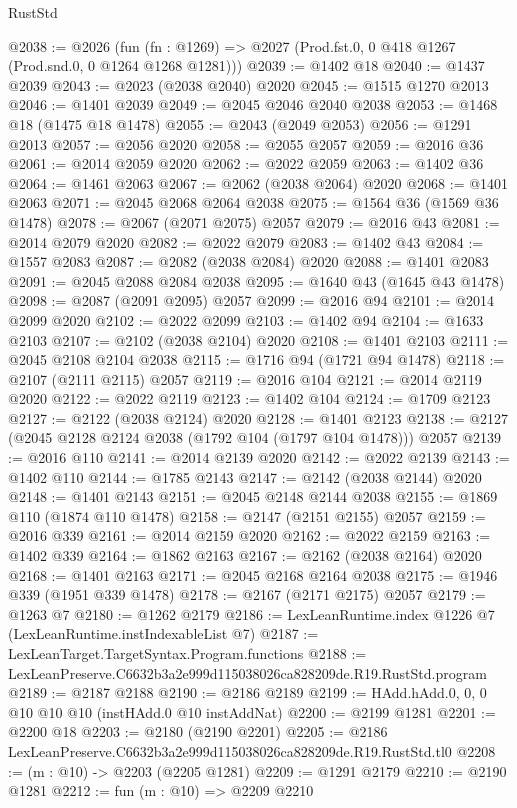 \begin{lexlean}{RustStd}
\begin{coremodule}
@2038 := @2026
    (fun (fn : @1269) => @2027 (Prod.fst.{0, 0} @418 @1267 (Prod.snd.{0, 0} @1264 @1268 @1281)))
@2039 := @1402 @18
@2040 := @1437 @2039
@2043 := @2023 (@2038 @2040) @2020
@2045 := @1515 @1270 @2013
@2046 := @1401 @2039
@2049 := @2045 @2046 @2040 @2038
@2053 := @1468 @18 (@1475 @18 @1478)
@2055 := @2043 (@2049 @2053)
@2056 := @1291 @2013
@2057 := @2056 @2020
@2058 := @2055 @2057
@2059 := @2016 @36
@2061 := @2014 @2059 @2020
@2062 := @2022 @2059
@2063 := @1402 @36
@2064 := @1461 @2063
@2067 := @2062 (@2038 @2064) @2020
@2068 := @1401 @2063
@2071 := @2045 @2068 @2064 @2038
@2075 := @1564 @36 (@1569 @36 @1478)
@2078 := @2067 (@2071 @2075) @2057
@2079 := @2016 @43
@2081 := @2014 @2079 @2020
@2082 := @2022 @2079
@2083 := @1402 @43
@2084 := @1557 @2083
@2087 := @2082 (@2038 @2084) @2020
@2088 := @1401 @2083
@2091 := @2045 @2088 @2084 @2038
@2095 := @1640 @43 (@1645 @43 @1478)
@2098 := @2087 (@2091 @2095) @2057
@2099 := @2016 @94
@2101 := @2014 @2099 @2020
@2102 := @2022 @2099
@2103 := @1402 @94
@2104 := @1633 @2103
@2107 := @2102 (@2038 @2104) @2020
@2108 := @1401 @2103
@2111 := @2045 @2108 @2104 @2038
@2115 := @1716 @94 (@1721 @94 @1478)
@2118 := @2107 (@2111 @2115) @2057
@2119 := @2016 @104
@2121 := @2014 @2119 @2020
@2122 := @2022 @2119
@2123 := @1402 @104
@2124 := @1709 @2123
@2127 := @2122 (@2038 @2124) @2020
@2128 := @1401 @2123
@2138 := @2127 (@2045 @2128 @2124 @2038 (@1792 @104 (@1797 @104 @1478))) @2057
@2139 := @2016 @110
@2141 := @2014 @2139 @2020
@2142 := @2022 @2139
@2143 := @1402 @110
@2144 := @1785 @2143
@2147 := @2142 (@2038 @2144) @2020
@2148 := @1401 @2143
@2151 := @2045 @2148 @2144 @2038
@2155 := @1869 @110 (@1874 @110 @1478)
@2158 := @2147 (@2151 @2155) @2057
@2159 := @2016 @339
@2161 := @2014 @2159 @2020
@2162 := @2022 @2159
@2163 := @1402 @339
@2164 := @1862 @2163
@2167 := @2162 (@2038 @2164) @2020
@2168 := @1401 @2163
@2171 := @2045 @2168 @2164 @2038
@2175 := @1946 @339 (@1951 @339 @1478)
@2178 := @2167 (@2171 @2175) @2057
@2179 := @1263 @7
@2180 := @1262 @2179
@2186 := LexLeanRuntime.index @1226 @7 (LexLeanRuntime.instIndexableList @7)
@2187 := LexLeanTarget.TargetSyntax.Program.functions
@2188 := LexLeanPreserve.C6632b3a2e999d115038026ca828209de.R19.RustStd.program
@2189 := @2187 @2188
@2190 := @2186 @2189
@2199 := HAdd.hAdd.{0, 0, 0} @10 @10 @10 (instHAdd.{0} @10 instAddNat)
@2200 := @2199 @1281
@2201 := @2200 @18
@2203 := @2180 (@2190 @2201)
@2205 := @2186 LexLeanPreserve.C6632b3a2e999d115038026ca828209de.R19.RustStd.tl0
@2208 := (m : @10) -> @2203 (@2205 @1281)
@2209 := @1291 @2179
@2210 := @2190 @1281
@2212 := fun (m : @10) => @2209 @2210

\end{coremodule}
\end{lexlean}
